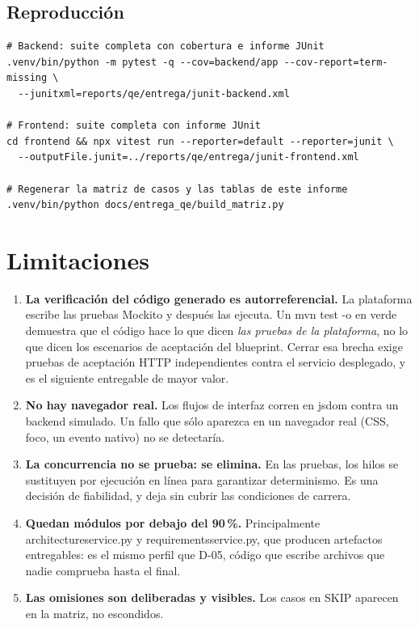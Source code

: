\documentclass[11pt,a4paper]{article}
\newcommand{\code}[1]{{\ttfamily\small\def\_{\textunderscore\allowbreak}#1}}
\begin{document}
\subsection*{Reproducción}
\label{sec:reproduccion}

\begin{lstlisting}
# Backend: suite completa con cobertura e informe JUnit
.venv/bin/python -m pytest -q --cov=backend/app --cov-report=term-missing \
  --junitxml=reports/qe/entrega/junit-backend.xml

# Frontend: suite completa con informe JUnit
cd frontend && npx vitest run --reporter=default --reporter=junit \
  --outputFile.junit=../reports/qe/entrega/junit-frontend.xml

# Regenerar la matriz de casos y las tablas de este informe
.venv/bin/python docs/entrega_qe/build_matriz.py
\end{lstlisting}

\section{Limitaciones}
\label{sec:limitaciones}

\begin{enumerate}[leftmargin=1.6em]
\item \textbf{La verificación del código generado es autorreferencial.} La plataforma escribe
      las pruebas Mockito y después las ejecuta. Un \code{mvn test -o} en verde demuestra que
      el código hace lo que dicen \emph{las pruebas de la plataforma}, no lo que dicen los
      escenarios de aceptación del blueprint. Cerrar esa brecha exige pruebas de aceptación HTTP
      independientes contra el servicio desplegado, y es el siguiente entregable de mayor valor.
\item \textbf{No hay navegador real.} Los flujos de interfaz corren en \code{jsdom} contra un
      backend simulado. Un fallo que sólo aparezca en un navegador real (CSS, foco, un evento
      nativo) no se detectaría.
\item \textbf{La concurrencia no se prueba: se elimina.} En las pruebas, los hilos se sustituyen
      por ejecución en línea para garantizar determinismo. Es una decisión de fiabilidad, y deja
      sin cubrir las condiciones de carrera.
\item \textbf{Quedan módulos por debajo del 90\,\%.} Principalmente
      \code{architecture\_service.py} y \code{requirements\_service.py}, que producen artefactos
      entregables: es el mismo perfil que D-05, código que escribe archivos que nadie comprueba
      hasta el final.
\item \textbf{Las omisiones son deliberadas y visibles.} Los casos en \code{SKIP} aparecen en la
      matriz, no escondidos.
\end{enumerate}
\end{document}
